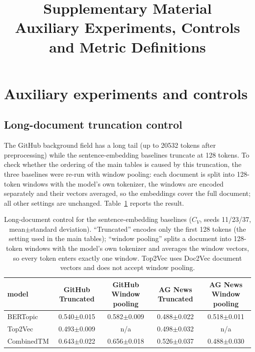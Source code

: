\documentclass[11pt]{article}
\title{\bfseries Supplementary Material\\[4pt]
\large Auxiliary Experiments, Controls and Metric Definitions}
\author{}
\date{}
\begin{document}
\maketitle

\section{Auxiliary experiments and controls}

\subsection{Long-document truncation control}

The GitHub background field has a long tail (up to 20532 tokens after preprocessing) while the
sentence-embedding baselines truncate at 128 tokens. To check whether the ordering of the main
tables is caused by this truncation, the three baselines were re-run with window pooling: each
document is split into 128-token windows with the model's own tokenizer, the windows are encoded
separately and their vectors averaged, so the embeddings cover the full document; all other
settings are unchanged. Table~\ref{tab:chunked} reports the result.

\begin{table}[t]
\centering
\caption{Long-document control for the sentence-embedding baselines ($C_V$, seeds 11/23/37, mean$\pm$standard deviation). ``Truncated'' encodes only the first 128 tokens (the setting used in the main tables); ``window pooling'' splits a document into 128-token windows with the model's own tokenizer and averages the window vectors, so every token enters exactly one window. Top2Vec uses Doc2Vec document vectors and does not accept window pooling.}
\label{tab:chunked}
\footnotesize
\setlength{\tabcolsep}{3pt}
\begin{tabular}{@{}lcccc@{}}
\toprule
model & GitHub Truncated & GitHub Window pooling & AG News Truncated & AG News Window pooling \\
\midrule
BERTopic & 0.540$\pm$0.015 & 0.582$\pm$0.009 & 0.488$\pm$0.022 & 0.518$\pm$0.011 \\
Top2Vec & 0.493$\pm$0.009 & n/a & 0.498$\pm$0.032 & n/a \\
CombinedTM & 0.643$\pm$0.022 & 0.656$\pm$0.018 & 0.526$\pm$0.037 & 0.488$\pm$0.030 \\
\bottomrule
\end{tabular}
\end{table}
\end{document}
